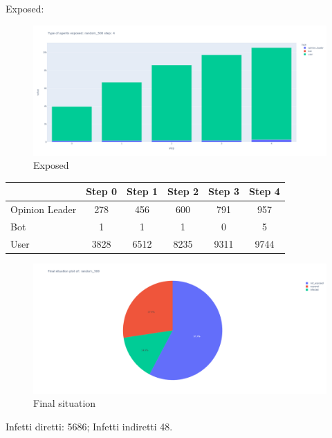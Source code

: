             Exposed:
            \begin{figure}[H]
                \includegraphics[width=16cm]{resources/charts/random_500_bar.png}
                \caption{Exposed}
                \label{fig:random_500_bar}
            \end{figure}
            
            \begin{table}[H]
                \centering
                \begin{tabular}{|l|c|c|c|c|c|}
                \hline
                               & Step 0 & Step 1 & Step 2 & Step 3 & Step 4 \\ \hline
                Opinion Leader & 278    & 456    & 600    & 791    & 957    \\ \hline
                Bot            & 1      & 1      & 1      & 0      & 5      \\ \hline
                User           & 3828   & 6512   & 8235   & 9311   & 9744   \\ \hline
                \end{tabular}
            \end{table}
            
            \begin{figure}[H]
                \includegraphics[width=16cm]{resources/charts/random_500_pie.png}
                \caption{Final situation}
                \label{fig:random_500_pie}
            \end{figure}
            Infetti diretti: 5686; \newline
            Infetti indiretti 48.
       
